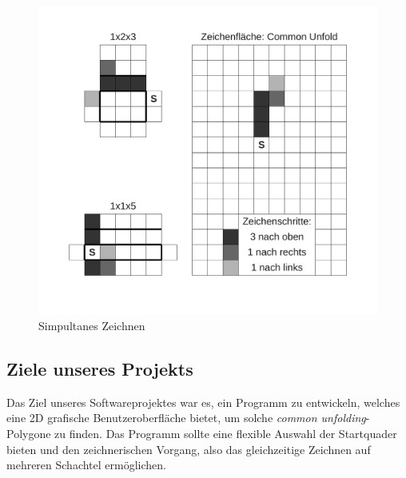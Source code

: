 \begin{figure}[htbp]
\centering
\includegraphics[scale=0.5]{03_pics/simulatnes_zeichnen.pdf}
\caption{Simpultanes Zeichnen}
\label{fig:Simpultanes-Zeichnen}
\end{figure}



\subsection{Ziele unseres Projekts}

Das Ziel unseres Softwareprojektes war es, ein Programm zu entwickeln, welches eine 2D grafische Benutzeroberfläche bietet, um solche \emph{common unfolding}-Polygone zu finden. Das Programm sollte eine flexible Auswahl der Startquader bieten und den zeichnerischen Vorgang, also das gleichzeitige Zeichnen auf mehreren Schachtel ermöglichen.